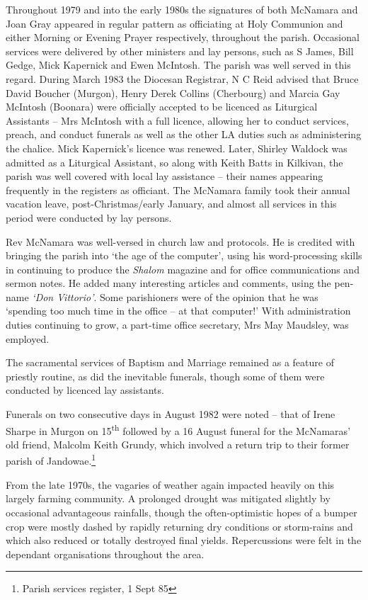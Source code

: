 Throughout 1979 and into the early 1980s the signatures of both McNamara and Joan Gray appeared in regular pattern as officiating at Holy Communion and either Morning or Evening Prayer respectively, throughout the parish. Occasional services were delivered by other ministers and lay persons, such as S James, Bill Gedge, Mick Kapernick and Ewen McIntosh. The parish was well served in this regard. During March 1983 the Diocesan Registrar, N C Reid advised that Bruce David Boucher (Murgon), Henry Derek Collins (Cherbourg) and Marcia Gay McIntosh (Boonara) were officially accepted to be licenced as Liturgical Assistants -- Mrs McIntosh with a full licence, allowing her to conduct services, preach, and conduct funerals as well as the other LA duties such as administering the chalice. Mick Kapernick's licence was renewed. Later, Shirley Waldock was admitted as a Liturgical Assistant, so along with Keith Batts in Kilkivan, the parish was well covered with local lay assistance -- their names appearing frequently in the registers as officiant. The McNamara family took their annual vacation leave, post-Christmas/early January, and almost all services in this period were conducted by lay persons.

Rev McNamara was well-versed in church law and protocols. He is credited with bringing the parish into `the age of the computer', using his word-processing skills in continuing to produce the \emph{Shalom} magazine and for office communications and sermon notes. He added many interesting articles and comments, using the pen-name \emph{`Don Vittorio'}. Some parishioners were of the opinion that he was `spending too much time in the office -- at that computer!' With administration duties continuing to grow, a part-time office secretary, Mrs May Maudsley, was employed.

The sacramental services of Baptism and Marriage remained as a feature of priestly routine, as did the inevitable funerals, though some of them were conducted by licenced lay assistants.

Funerals on two consecutive days in August 1982 were noted -- that of Irene Sharpe in Murgon on 15\textsuperscript{th} followed by a 16 August funeral for the McNamaras' old friend, Malcolm Keith Grundy, which involved a return trip to their former parish of Jandowae.\footnote{Parish services register, 1 Sept 85}

From the late 1970s, the vagaries of weather again impacted heavily on this largely farming community. A prolonged drought was mitigated slightly by occasional advantageous rainfalls, though the often-optimistic hopes of a bumper crop were mostly dashed by rapidly returning dry conditions or storm-rains and which also reduced or totally destroyed final yields. Repercussions were felt in the dependant organisations throughout the area.

